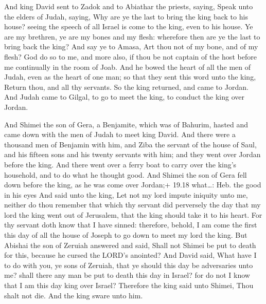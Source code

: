  And king David sent to Zadok and to Abiathar the
priests, saying, Speak unto the elders of Judah, saying, Why are ye the
last to bring the king back to his house? seeing the speech of all
Israel is come to the king, even to his house.  Ye are my
brethren, ye are my bones and my flesh: wherefore then are ye the last
to bring back the king?  And say ye to Amasa, Art thou not
of my bone, and of my flesh? God do so to me, and more also, if thou be
not captain of the host before me continually in the room of Joab.
 And he bowed the heart of all the men of Judah, even as
the heart of one man; so that they sent this word unto the king, Return
thou, and all thy servants.  So the king returned, and came
to Jordan. And Judah came to Gilgal, to go to meet the king, to conduct
the king over Jordan.

 And Shimei the son of Gera, a Benjamite, which was of
Bahurim, hasted and came down with the men of Judah to meet king David.
 And there were a thousand men of Benjamin with him, and
Ziba the servant of the house of Saul, and his fifteen sons and his
twenty servants with him; and they went over Jordan before the king.
 And there went over a ferry boat to carry over the king's
household, and to do what he thought good. And Shimei the son of Gera
fell down before the king, as he was come over Jordan;+ 19.18
what\ldots: Heb. the good in his eyes  And said unto the
king, Let not my lord impute iniquity unto me, neither do thou remember
that which thy servant did perversely the day that my lord the king went
out of Jerusalem, that the king should take it to his heart.
 For thy servant doth know that I have sinned: therefore,
behold, I am come the first this day of all the house of Joseph to go
down to meet my lord the king.  But Abishai the son of
Zeruiah answered and said, Shall not Shimei be put to death for this,
because he cursed the LORD's anointed?  And David said,
What have I to do with you, ye sons of Zeruiah, that ye should this day
be adversaries unto me? shall there any man be put to death this day in
Israel? for do not I know that I am this day king over Israel?
 Therefore the king said unto Shimei, Thou shalt not die.
And the king sware unto him.

